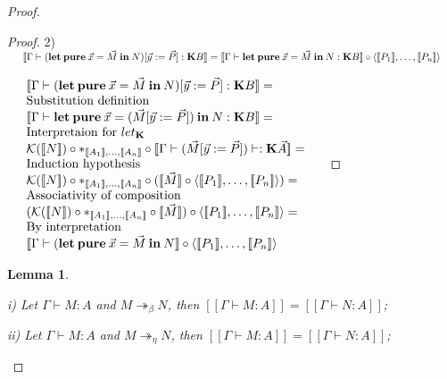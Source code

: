 \documentclass[a4paper]{article}
\newtheorem{lemma}{Lemma}
\begin{document}
\begin{proof}
\begin{proof}
\vspace{\baselineskip}

2) $\begin{array}{lll}&[\![\Gamma \vdash ({\bf let \: pure} \: \vec{x} = \vec{M} {\: \bf in \:} N) [\vec{y} := \vec{P}] : {\bf K} B]\!]
=[\![\Gamma \vdash {\bf let \: pure} \: \vec{x} = \vec{M} {\: \bf in \:} N : {\bf K}B]\!] \circ \langle [\![P_1]\!],\dots,[\![P_n]\!]\rangle& \end{array}$

\vspace{\baselineskip}

$\begin{array}{lll}
&[\![\Gamma \vdash ({\bf let \: pure} \: \vec{x} = \vec{M} {\: \bf in \:} N) [\vec{y} := \vec{P}] : {\bf K} B]\!] =& \\
&\text{Substitution definition}& \\
&[\![\Gamma \vdash {\bf let \: pure} \: \vec{x} = (\vec{M} [\vec{y} := \vec{P}]) {\: \bf in \:} N : {\bf K}B]\!] =& \\
&\text{Interpretaion for $let_{\bf K}$}& \\
&\mathcal{K}([\![N]\!]) \circ \ast_{[\![A_1]\!],\dots,[\![A_n]\!]} \circ [\![\Gamma \vdash (\vec{M} [\vec{y} := \vec{P}]) \vdash : {\bf K}\vec{A}]\!] =& \\
&\text{Induction hypothesis}& \\
&\mathcal{K}([\![N]\!]) \circ \ast_{[\![A_1]\!],\dots,[\![A_n]\!]} \circ ([\![\vec{M}]\!] \circ \langle [\![P_1]\!],\dots,[\![P_n]\!]\rangle) = & \\
&\text{Associativity of composition}& \\
&(\mathcal{K}([\![N]\!]) \circ \ast_{[\![A_1]\!],\dots,[\![A_n]\!]} \circ [\![\vec{M}]\!]) \circ \langle [\![P_1]\!],\dots,[\![P_n]\!]\rangle = & \\
&\text{By interpretation}&\\
&[\![\Gamma \vdash ({\bf let \: pure} \: \vec{x} = \vec{M} {\: \bf in \:} N]\!] \circ \langle [\![P_1]\!],\dots,[\![P_n]\!]\rangle&
\end{array}$

\end{proof}

\begin{lemma}
  $ $

  i) Let $\Gamma \vdash M : A$ and $M \twoheadrightarrow_{\beta} N$, then $[\![\Gamma \vdash M : A]\!] = [\![\Gamma \vdash N : A]\!]$;

  ii) Let $\Gamma \vdash M : A$ and $M \twoheadrightarrow_{\eta} N$, then $[\![\Gamma \vdash M : A]\!] = [\![\Gamma \vdash N : A]\!]$;
\end{lemma}


\end{proof}
\end{document}
